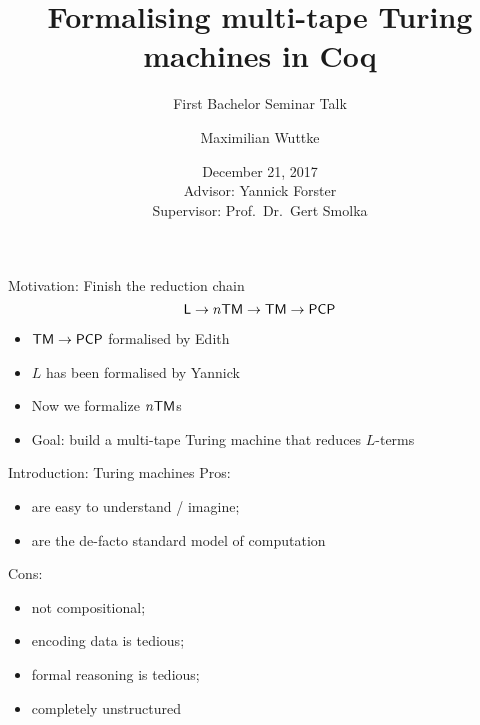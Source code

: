 


\renewcommand{\Type}{\mathbb{T}}
\renewcommand{\Nat}{\mathbb{N}}
\renewcommand{\Bool}{\mathbb{B}}
\renewcommand{\Option}{\mathcal{O}}

\beamertemplatenavigationsymbolsempty%

\newcommand\refs[1]{%
  \begin{textblock*}{8cm}(0.3cm,9.0cm)%
    \scriptsize {\color{gray}#1}
  \end{textblock*}
}


\title{Formalising multi-tape Turing machines in Coq}
\subtitle{First Bachelor Seminar Talk}
\author{Maximilian Wuttke}
\date{December 21, 2017\\
  \bigskip{}
  \bigskip{}
  {
    \tiny
    Advisor: Yannick Forster\\
    Supervisor: Prof.\ Dr.\ Gert Smolka%
  }
}


% 



\frame{\titlepage}

\begin{frame}{Motivation: Finish the reduction chain}
  \[\textsf{L} \rightarrow n\textsf{TM} \rightarrow \textsf{TM} \rightarrow \textsf{PCP}\]

  \begin{itemize}
    \pause\item $\textsf{TM} \rightarrow \textsf{PCP}$ formalised by Edith
    \pause\item $L$ has been formalised by Yannick
    \pause\item Now we formalize $n\textsf{TM}$s
    \pause\item Goal: build a multi-tape Turing machine that reduces $L$-terms
  \end{itemize}
\end{frame}

\begin{frame}{Introduction: Turing machines}
  Pros:
  \begin{itemize}
    \item are easy to understand / imagine;
    \item are the de-facto standard model of computation
  \end{itemize}
  \pause%
  Cons:
  \begin{itemize}
    \item not compositional;
    \item encoding data is tedious;
    \item formal reasoning is tedious;
    \item completely unstructured
  \end{itemize}
\end{frame}

